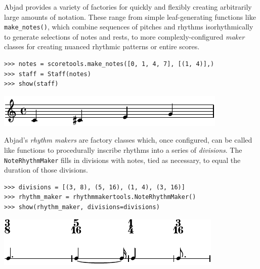 \documentclass{article}
\begin{document}
Abjad provides a variety of factories for quickly and flexibly
creating arbitrarily large amounts of notation. These range from simple
leaf-generating functions like \texttt{make\_notes()}, which combine sequences
of pitches and rhythms isorhythmically to generate selections of notes and
rests, to more complexly-configured \emph{maker} classes for creating nuanced
rhythmic patterns or entire scores.

\begin{lstlisting}
>>> notes = scoretools.make_notes([0, 1, 4, 7], [(1, 4)],)
>>> staff = Staff(notes)
>>> show(staff)
\end{lstlisting}
\includegraphics{assets/lilypond-64155bcaa384109d40ae2616a2224dd1.pdf}

\noindent Abjad's \emph{rhythm makers} are factory classes which, once
configured, can be called like functions to procedurally inscribe rhythms into
a series of \emph{divisions}. The \texttt{NoteRhythmMaker} fills in divisions
with notes, tied as necessary, to equal the duration of those divisions.

\begin{lstlisting}
>>> divisions = [(3, 8), (5, 16), (1, 4), (3, 16)]
>>> rhythm_maker = rhythmmakertools.NoteRhythmMaker()
>>> show(rhythm_maker, divisions=divisions)
\end{lstlisting}
\includegraphics{assets/lilypond-af2aa88dc88360a6a0cf5c3f8da17b85.pdf}
\end{document}
